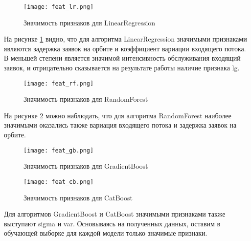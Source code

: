 \begin{figure}[H]
	\centering
	\texttt{[image: feat\_lr.png]}
	\caption{Значимость признаков для LinearRegression}
	\label{feat_lr}
\end{figure}
На рисунке \ref{feat_lr} видно, что для алгоритма LinearRegression значимыми признаками являются задержка заявок на орбите и коэффициент вариации входящего потока. В меньшей степени является значимой интенсивность обслуживания входящий заявок, и отрицательно сказывается на результате работы наличие признака lg.
\begin{figure}[H]
	\centering
	\texttt{[image: feat\_rf.png]}
	\caption{Значимость признаков для RandomForest}
	\label{feat_rf}
\end{figure}
На рисунке \ref{feat_rf} можно наблюдать, что для алгоритма RandomForest наиболее значимыми оказались также вариация входящего потока и задержка заявок на орбите.
\begin{figure}[H]
	\centering
	\texttt{[image: feat\_gb.png]}
	\caption{Значимость признаков для GradientBoost}
	\label{feat_gb}
\end{figure}
\begin{figure}[H]
	\centering
	\texttt{[image: feat\_cb.png]}
	\caption{Значимость признаков для CatBoost}
	\label{feat_cb}
\end{figure}
Для алгоритмов GradientBoost и CatBoost значимыми признаками также выступают sigma и var. Основываясь на полученных данных, оставим в обучающей выборке для каждой модели только значимые признаки.

